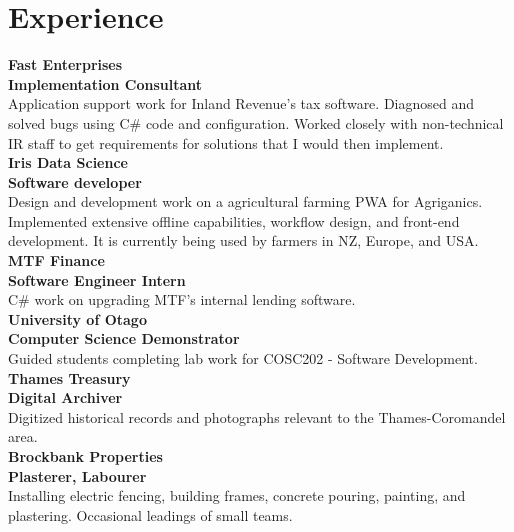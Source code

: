 \documentclass[lighthipster]{simplehipstercv}
\begin{document}
    \begin{minipage}[t]{1\textwidth}
    \section*{Experience}
    
    \textbf{Fast Enterprises}\\
    \textbf{Implementation Consultant}\\
    Application support work for Inland Revenue's tax software. Diagnosed and solved bugs using C\# code and configuration. Worked closely with non-technical IR staff to get requirements for solutions that I would then implement. \\
    
    \textbf{Iris Data Science}\\
    \textbf{Software developer}\\
    Design and development work on a agricultural farming PWA for Agriganics. 
        Implemented extensive offline capabilities, workflow design, and front-end development.
        It is currently being used by farmers in NZ, Europe, and USA.\\
    
    \textbf{MTF Finance}\\
    \textbf{Software Engineer Intern}\\
    C\# work on upgrading MTF's internal lending software.\\
    
    \textbf{University of Otago}\\
    \textbf{Computer Science Demonstrator}\\
    Guided students completing lab work for COSC202 - Software Development.\\
    
    \textbf{Thames Treasury}\\
    \textbf{Digital Archiver}\\
    Digitized historical records and photographs relevant to the Thames-Coromandel area.\\
    
    \textbf{Brockbank Properties}\\
    \textbf{Plasterer, Labourer}\\
    Installing electric fencing, building frames, concrete pouring, painting, and plastering. Occasional leadings of small teams.\\
      
    \end{minipage}    
    \bigskip
    
\end{document}
